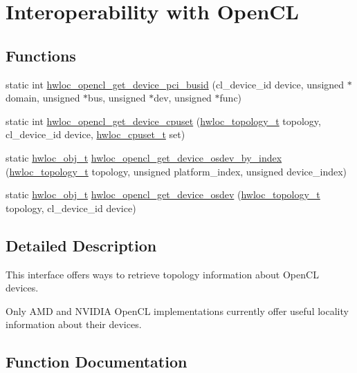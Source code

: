 \hypertarget{a00218}{}\section{Interoperability with Open\+CL}
\label{a00218}
\subsection*{Functions}
\begin{DoxyCompactItemize}
\item 
static int \hyperlink{a00218_gab89e4d20f8a353299351b41849e35ac9}{hwloc\+\_\+opencl\+\_\+get\+\_\+device\+\_\+pci\+\_\+busid} (cl\+\_\+device\+\_\+id device, unsigned $\ast$domain, unsigned $\ast$bus, unsigned $\ast$dev, unsigned $\ast$func)
\item 
static int \hyperlink{a00218_gacc32737d4648d16b0d292438f210ec90}{hwloc\+\_\+opencl\+\_\+get\+\_\+device\+\_\+cpuset} (\hyperlink{a00186_ga9d1e76ee15a7dee158b786c30b6a6e38}{hwloc\+\_\+topology\+\_\+t} topology, cl\+\_\+device\+\_\+id device, \hyperlink{a00183_ga4bbf39b68b6f568fb92739e7c0ea7801}{hwloc\+\_\+cpuset\+\_\+t} set)
\item 
static \hyperlink{a00185_ga79b8ab56877ef99ac59b833203391c7d}{hwloc\+\_\+obj\+\_\+t} \hyperlink{a00218_gae39352d124cb330eb37b84b418ed6cc5}{hwloc\+\_\+opencl\+\_\+get\+\_\+device\+\_\+osdev\+\_\+by\+\_\+index} (\hyperlink{a00186_ga9d1e76ee15a7dee158b786c30b6a6e38}{hwloc\+\_\+topology\+\_\+t} topology, unsigned platform\+\_\+index, unsigned device\+\_\+index)
\item 
static \hyperlink{a00185_ga79b8ab56877ef99ac59b833203391c7d}{hwloc\+\_\+obj\+\_\+t} \hyperlink{a00218_gadabfa6516aa12e5d8f79b9b4dd9f3cf8}{hwloc\+\_\+opencl\+\_\+get\+\_\+device\+\_\+osdev} (\hyperlink{a00186_ga9d1e76ee15a7dee158b786c30b6a6e38}{hwloc\+\_\+topology\+\_\+t} topology, cl\+\_\+device\+\_\+id device)
\end{DoxyCompactItemize}


\subsection{Detailed Description}
This interface offers ways to retrieve topology information about Open\+CL devices.

Only A\+MD and N\+V\+I\+D\+IA Open\+CL implementations currently offer useful locality information about their devices. 

\subsection{Function Documentation}
\mbox{\label{a00218_gacc32737d4648d16b0d292438f210ec90}} 
